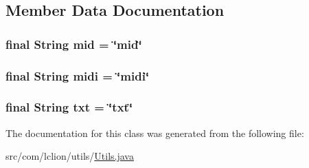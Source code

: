 \subsection{Member Data Documentation}
\hypertarget{classcom_1_1lclion_1_1utils_1_1_utils_a3458eafa3d7fbe572e452cd38bf6f642}{
\subsubsection[{mid}]{\setlength{\rightskip}{0pt plus 5cm}final String mid = \char`\"{}mid\char`\"{}\hspace{0.3cm}{\ttfamily [static]}}}\label{classcom_1_1lclion_1_1utils_1_1_utils_a3458eafa3d7fbe572e452cd38bf6f642}
\hypertarget{classcom_1_1lclion_1_1utils_1_1_utils_a64d2958fc1bd8660447bb24a8536f66b}{
\subsubsection[{midi}]{\setlength{\rightskip}{0pt plus 5cm}final String midi = \char`\"{}midi\char`\"{}\hspace{0.3cm}{\ttfamily [static]}}}\label{classcom_1_1lclion_1_1utils_1_1_utils_a64d2958fc1bd8660447bb24a8536f66b}
\hypertarget{classcom_1_1lclion_1_1utils_1_1_utils_a28851ed2eafa51aa3babb5def795ae36}{
\subsubsection[{txt}]{\setlength{\rightskip}{0pt plus 5cm}final String txt = \char`\"{}txt\char`\"{}\hspace{0.3cm}{\ttfamily [static]}}}\label{classcom_1_1lclion_1_1utils_1_1_utils_a28851ed2eafa51aa3babb5def795ae36}


The documentation for this class was generated from the following file\+:\begin{DoxyCompactItemize}
\item 
src/com/lclion/utils/\hyperlink{_utils_8java}{Utils.\+java}\end{DoxyCompactItemize}
